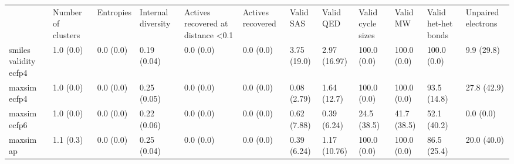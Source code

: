 \begin{tabular}{llllllllllll}
 & Number of clusters & Entropies & Internal diversity & Actives recovered at distance <0.1 & Actives recovered & Valid SAS & Valid QED & Valid cycle sizes & Valid MW & Valid het-het bonds & Unpaired electrons \\
smiles validity ecfp4 & {\cellcolor[HTML]{F6FCFD}} \color[HTML]{000000} 1.0 (0.0) & {\cellcolor[HTML]{F7FCFD}} \color[HTML]{000000} 0.0 (0.0) & {\cellcolor[HTML]{51B689}} \color[HTML]{F1F1F1} 0.19 (0.04) & {\cellcolor[HTML]{F7FCFD}} \color[HTML]{000000} 0.0 (0.0) & {\cellcolor[HTML]{F7FCFD}} \color[HTML]{000000} 0.0 (0.0) & {\cellcolor[HTML]{F2FAFC}} \color[HTML]{000000} 3.75 (19.0) & {\cellcolor[HTML]{F3FAFC}} \color[HTML]{000000} 2.97 (16.97) & {\cellcolor[HTML]{E8F6FA}} \color[HTML]{000000} 100.0 (0.0) & {\cellcolor[HTML]{F5FBFD}} \color[HTML]{000000} 100.0 (0.0) & {\cellcolor[HTML]{E3F4F8}} \color[HTML]{000000} 100.0 (0.0) & {\cellcolor[HTML]{B8E4DB}} \color[HTML]{000000} 9.9 (29.8) \\
maxsim ecfp4 & {\cellcolor[HTML]{F6FCFD}} \color[HTML]{000000} 1.0 (0.0) & {\cellcolor[HTML]{F7FCFD}} \color[HTML]{000000} 0.0 (0.0) & {\cellcolor[HTML]{54B88E}} \color[HTML]{F1F1F1} 0.25 (0.05) & {\cellcolor[HTML]{F7FCFD}} \color[HTML]{000000} 0.0 (0.0) & {\cellcolor[HTML]{F7FCFD}} \color[HTML]{000000} 0.0 (0.0) & {\cellcolor[HTML]{F7FCFD}} \color[HTML]{000000} 0.08 (2.79) & {\cellcolor[HTML]{F5FBFC}} \color[HTML]{000000} 1.64 (12.7) & {\cellcolor[HTML]{8FD4C2}} \color[HTML]{000000} 100.0 (0.0) & {\cellcolor[HTML]{F4FBFC}} \color[HTML]{000000} 100.0 (0.0) & {\cellcolor[HTML]{D7F0EE}} \color[HTML]{000000} 93.5 (14.8) & {\cellcolor[HTML]{E9F7FA}} \color[HTML]{000000} 27.8 (42.9) \\
maxsim ecfp6 & {\cellcolor[HTML]{F6FCFD}} \color[HTML]{000000} 1.0 (0.0) & {\cellcolor[HTML]{F7FCFD}} \color[HTML]{000000} 0.0 (0.0) & {\cellcolor[HTML]{5ABB95}} \color[HTML]{F1F1F1} 0.22 (0.06) & {\cellcolor[HTML]{F7FCFD}} \color[HTML]{000000} 0.0 (0.0) & {\cellcolor[HTML]{F7FCFD}} \color[HTML]{000000} 0.0 (0.0) & {\cellcolor[HTML]{F6FCFD}} \color[HTML]{000000} 0.62 (7.88) & {\cellcolor[HTML]{F6FCFD}} \color[HTML]{000000} 0.39 (6.24) & {\cellcolor[HTML]{B0E1D6}} \color[HTML]{000000} 24.5 (38.5) & {\cellcolor[HTML]{EBF7FA}} \color[HTML]{000000} 41.7 (38.5) & {\cellcolor[HTML]{78CAB1}} \color[HTML]{000000} 52.1 (40.2) & {\cellcolor[HTML]{D8F0EF}} \color[HTML]{000000} 0.0 (0.0) \\
maxsim ap & {\cellcolor[HTML]{F6FCFD}} \color[HTML]{000000} 1.1 (0.3) & {\cellcolor[HTML]{F7FCFD}} \color[HTML]{000000} 0.0 (0.0) & {\cellcolor[HTML]{59BB93}} \color[HTML]{F1F1F1} 0.25 (0.04) & {\cellcolor[HTML]{F7FCFD}} \color[HTML]{000000} 0.0 (0.0) & {\cellcolor[HTML]{F7FCFD}} \color[HTML]{000000} 0.0 (0.0) & {\cellcolor[HTML]{F6FCFD}} \color[HTML]{000000} 0.39 (6.24) & {\cellcolor[HTML]{F5FBFD}} \color[HTML]{000000} 1.17 (10.76) & {\cellcolor[HTML]{B7E4DA}} \color[HTML]{000000} 100.0 (0.0) & {\cellcolor[HTML]{F0F9FB}} \color[HTML]{000000} 100.0 (0.0) & {\cellcolor[HTML]{BAE5DC}} \color[HTML]{000000} 86.5 (25.4) & {\cellcolor[HTML]{DBF2F2}} \color[HTML]{000000} 20.0 (40.0) \\

\end{tabular}
